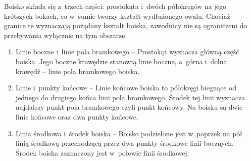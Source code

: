 \documentclass[12pt,a4paper]{article}
\renewcommand{\subsubsection}[1]{
  \oldsubsubsection{#1}%
  \leftskip1.3cm
}
\begin{document}
\subsubsection{Kształt boiska}
Boisko składa się z~trzech części: prostokąta i~dwóch półokręgów na jego
krótszych bokach, co w~sumie tworzy kształt wydłużonego owalu. Chociaż
granice te wyznaczają pożądany kształt boiska, zawodnicy nie są
ograniczeni do przebywania wyłącznie na tym obszarze.
\begin{enumerate}
	\item{Linie boczne i~linie pola bramkowego} -- Prostokąt wyznacza
	      główną część boiska. Jego boczne krawędzie stanowią linie boczne, a~górna i~dolna krawędź -- linie pola bramkowego boiska.

	\item{Linie i~punkty końcowe} -- Linie końcowe boiska to
	      półokręgi biegnące od jednego do drugiego końca linii pola bramkowego.
	      Środek tej linii wyznacza najdalszy punkt pola bramkowego czyli punkt końcowy. Na boisku są dwie linie końcowe oraz dwa punkty końcowe.

	\item{Linia środkowa i~środek boiska} -- Boisko podzielone
	      jest w~poprzek na pół linią środkową przechodzącą przez dwa punkty środkowe linii bocznych. Środek boiska zaznaczony jest w~połowie linii środkowej.
\end{enumerate}
\end{document}
